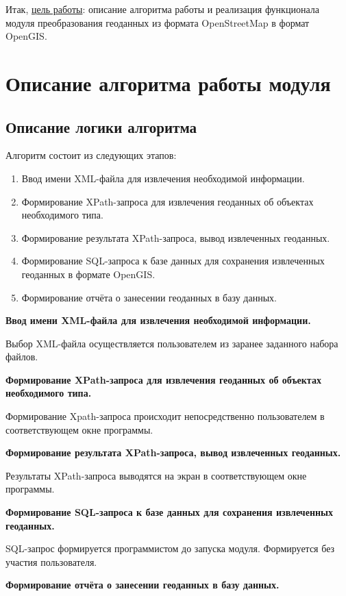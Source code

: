 \documentclass[12pt,a4paper,oneside]{article} %
\begin{document}
{Итак, \underline{цель работы}: описание алгоритма работы \linebreak
и реализация функционала модуля преобразования геоданных \linebreak
из формата OpenStreetMap в формат OpenGIS.}

\newpage
\section{Описание алгоритма работы модуля}
\subsection{Описание логики алгоритма}
Алгоритм состоит из следующих этапов:
\begin{enumerate}
\item Ввод имени XML-файла для извлечения необходимой информации.
\item Формирование XPath-запроса для извлечения геоданных об объектах необходимого типа.
\item Формирование результата XPath-запроса, вывод извлеченных геоданных.
\item Формирование SQL-запроса к базе данных для сохранения извлеченных геоданных в формате OpenGIS.
\item Формирование отчёта о занесении геоданных в базу данных.
\end{enumerate}

\textbf{Ввод имени XML-файла для извлечения необходимой информации.}

Выбор XML-файла осуществляется пользователем из заранее заданного набора файлов.

\textbf{Формирование XPath-запроса для извлечения геоданных об объектах необходимого типа.}

Формирование Xpath-запроса происходит непосредственно пользователем в соответствующем окне программы.

\textbf{Формирование результата XPath-запроса, вывод извлеченных геоданных.}

Результаты XPath-запроса выводятся на экран в соответствующем окне программы.

\textbf{Формирование SQL-запроса к базе данных для сохранения извлеченных геоданных.}

SQL-запрос формируется программистом до запуска модуля. Формируется без участия пользователя.

\textbf{Формирование отчёта о занесении геоданных в базу данных.}
\end{document}
